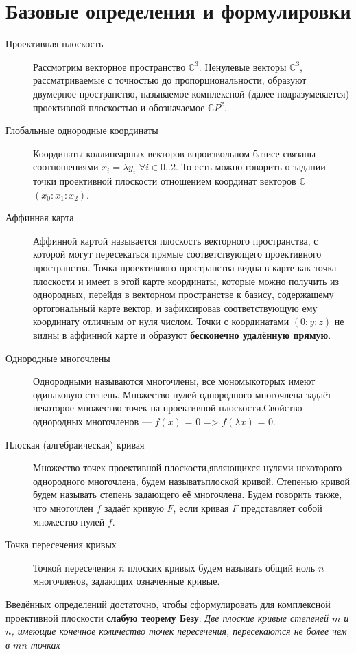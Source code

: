 \documentclass[a4paper, 12pt]{article}
\begin{document}
\section{Базовые определения и формулировки}
\begin{description}
\item[Проективная плоскость]
Рассмотрим векторное пространство $\mathbb{C}^3$. Ненулевые векторы $\mathbb{C}^3$, рассматриваемые с точностью до пропорциональности, образуют двумерное пространство, называемое комплексной (далее подразумевается) проективной плоскостью и обозначаемое $\mathbb{C}P^2$.
\item[Глобальные однородные координаты]
Координаты коллинеарных векторов в\newline произвольном базисе связаны соотношениями $x_i = \lambda y_i$ $\forall i \in {0..2}$. То есть можно говорить о задании точки проективной плоскости отношением координат векторов $\mathbb{C}$ $(x_0:x_1:x_2)$.
\item[Аффинная карта]
Аффинной картой называется плоскость векторного пространства, с которой могут пересекаться прямые соответствующего проективного пространства. Точка проективного пространства видна в карте как точка плоскости и имеет в этой карте координаты, которые можно получить из однородных, перейдя в векторном пространстве к базису, содержащему ортогональный карте вектор, и зафиксировав соответствующую ему координату отличным от нуля числом. Точки с координатами $(0:y:z)$ не видны в аффинной карте и образуют \textbf{бесконечно удалённую прямую}.
\end{description}
\begin{description}
\item[Однородные многочлены] Однородными называются многочлены, все мономы\newline которых имеют одинаковую степень. Множество нулей однородного многочлена задаёт некоторое множество точек на проективной плоскости.\newline Свойство однородных многочленов --- $f(x)$ = $0$ => $f(\lambda x)$ = $0$.
\item[Плоская (алгебраическая) кривая]
Множество точек проективной плоскости,\newline являющихся нулями некоторого однородного многочлена, будем называть\newline плоской кривой. Степенью кривой будем называть степень задающего её многочлена. Будем говорить также, что многочлен $f$ задаёт кривую $F$, если кривая $F$ представляет собой множество нулей $f$.
\item[Точка пересечения кривых]
Точкой пересечения $n$ плоских кривых будем называть общий ноль $n$ многочленов, задающих означенные кривые.
\end{description}
Введённых определений достаточно, чтобы сформулировать для комплексной проективной плоскости \textbf{слабую теорему Безу}:
\textit{Две плоские кривые степеней $m$ и $n$, имеющие конечное количество точек пересечения, пересекаются не более чем в $mn$ точках}
\pagebreak
\end{document}
